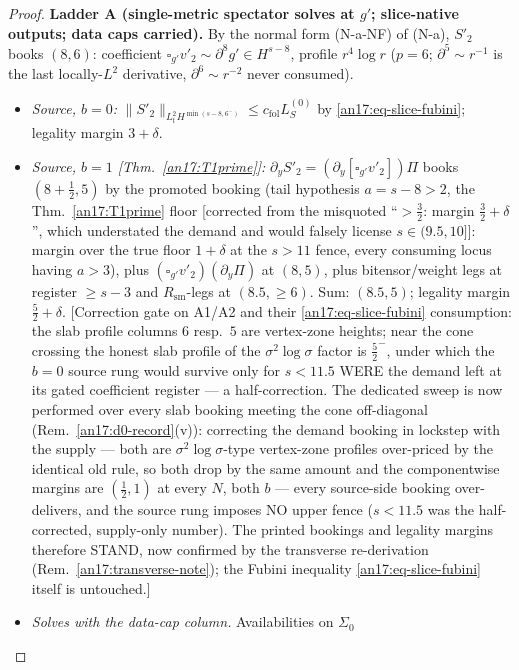 \begin{proof}
\medskip\noindent
\textbf{Ladder A (single-metric spectator solves at $g'$; slice-native
outputs; data caps carried).} By the normal form (N-a-NF) of \textup{(N-a)},
$S'_2$ books $(8,6)$: coefficient $\square_{g'}v'_2\sim\partial^8g'\in H^{s-8}$,
profile $r^4\log r$ ($p=6$; $\partial^5\sim r^{-1}$ is the last locally-$L^2$
derivative, $\partial^6\sim r^{-2}$ never consumed).
\begin{itemize}
\item[A1.] \emph{Source, $b=0$:} $\|S'_2\|_{L^2_t H^{\min(s-8,6^-)}}\le
  c_{\mathrm{fol}}L^{(0)}_S$ by \eqref{an17:eq-slice-fubini}; legality margin
  $3+\delta$.
\item[A2.] \emph{Source, $b=1$ \textup{[Thm.~\ref{an17:T1prime}]}:}
  $\partial_yS'_2=(\partial_y[\square_{g'}v'_2])\Pi$ books $(8{+}\tfrac12,5)$ by
  the promoted booking (tail hypothesis $a=s-8>2$, the
  Thm.~\ref{an17:T1prime} floor \textup{[corrected from the misquoted
  ``$>\tfrac32$: margin $\tfrac32+\delta$'', which understated the demand and
  would falsely license $s\in(9.5,10]$]}: margin over the true floor $1+\delta$
  at the $s>11$ fence, every consuming locus having $a>3$), plus $(\square_{g'}v'_2)(\partial_y\Pi)$ at $(8,5)$, plus
  bitensor/weight legs at register $\ge s-3$ and $R_{\mathrm{sm}}$-legs at
  $(8.5,\ge6)$. Sum: $(8.5,5)$; legality margin $\tfrac52+\delta$.
  \textup{[Correction gate on A1/A2 and their \eqref{an17:eq-slice-fubini}
  consumption: the slab profile columns $6$ resp.\ $5$ are vertex-zone
  heights; near the cone crossing the honest slab profile of the
  $\sigma^2\log\sigma$ factor is $\tfrac52^-$, under which the $b{=}0$ source
  rung would survive only for $s<11.5$ WERE the demand left at its gated
  coefficient register --- a half-correction. The dedicated sweep is now
  performed over every slab booking meeting the cone off-diagonal
  (Rem.~\ref{an17:d0-record}(v)): correcting the demand booking in lockstep
  with the supply --- both are $\sigma^2\log\sigma$-type vertex-zone profiles
  over-priced by the identical old rule, so both drop by the same amount and
  the componentwise margins are $(\tfrac12,1)$ at every $N$, both $b$ --- every
  source-side booking over-delivers, and the source rung imposes NO upper fence
  ($s<11.5$ was the half-corrected, supply-only number). The printed bookings
  and legality margins therefore STAND, now confirmed by the transverse
  re-derivation (Rem.~\ref{an17:transverse-note}); the Fubini inequality
  \eqref{an17:eq-slice-fubini} itself is untouched.]}
\item[A3.] \emph{Solves with the data-cap column.} Availabilities on $\Sigma_0$

\end{itemize}
\end{proof}
